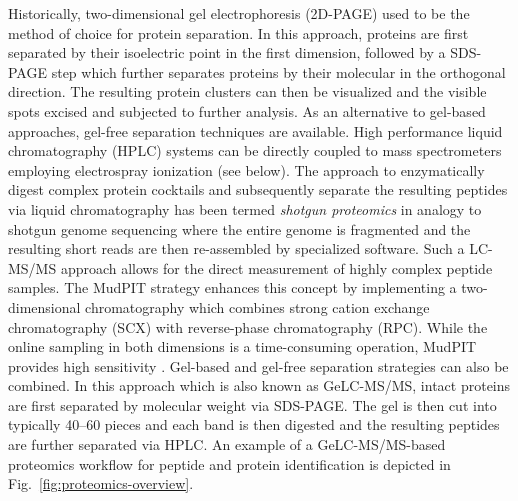 Historically, two-dimensional gel electrophoresis (2D-PAGE) used to be the 
method of choice for protein separation. 
In this approach, proteins are first separated by their isoelectric point in
the first dimension, followed by a SDS-PAGE step which further separates
proteins by their molecular in the orthogonal direction.
The resulting protein clusters can then be visualized and the visible spots
excised and subjected to further analysis.
As an alternative to gel-based approaches, gel-free separation techniques
are available.
High performance liquid chromatography (HPLC) systems can be directly coupled
to mass spectrometers employing electrospray ionization (see below).
The approach to enzymatically digest complex protein cocktails and subsequently
separate the resulting peptides via liquid chromatography has been termed 
{\em shotgun proteomics} in analogy to shotgun genome sequencing where
the entire genome is fragmented and the resulting short reads are then 
re-assembled by specialized software.
Such a LC-MS/MS approach allows for the direct measurement of highly complex 
peptide samples.
The MudPIT strategy enhances this concept by implementing a two-dimensional
chromatography which combines strong cation exchange chromatography (SCX) with
reverse-phase chromatography (RPC).
While the online sampling in both dimensions is a time-consuming operation,
MudPIT provides high sensitivity \citep{Washburn2001, Wolters2001}.
Gel-based and gel-free separation strategies can also be combined.
In this approach which is also known as GeLC-MS/MS, intact proteins are 
first separated by molecular weight via SDS-PAGE.
The gel is then cut into typically 40--60 pieces and each band is then 
digested and the resulting peptides are further separated via HPLC.
An example of a GeLC-MS/MS-based proteomics workflow for peptide and protein 
identification is depicted in Fig.~\ref{fig:proteomics-overview}.


